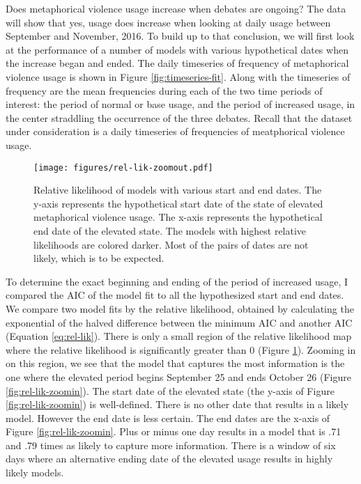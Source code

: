 Does metaphorical violence usage increase when debates are ongoing? The data
will show that yes, usage does increase when looking at daily usage between September and November,
2016. To build up to that conclusion, we will first look at the performance
of a number of models with various hypothetical dates when the increase
began and ended. The daily timeseries of frequency of metaphorical violence
usage is shown in Figure \ref{fig:timeseries-fit}. Along with the timeseries
of frequency are the mean frequencies during each of the two time periods of
interest: the period of normal or base usage, and the period of increased usage,
in the center straddling the occurrence of the three debates. Recall that the
dataset under consideration is a daily timeseries of frequencies of meatphorical 
violence usage.  

\begin{figure}[h!]
  \centering
  \texttt{[image: figures/rel-lik-zoomout.pdf]}
  \caption{Relative likelihood of models with various start
  and end dates. The y-axis represents the hypothetical start date of the state of
  elevated metaphorical violence usage. The x-axis represents the hypothetical
  end date of the elevated state. 
  The models with highest relative likelihoods are colored darker. Most of the
  pairs of dates are not likely, which is to be expected.}
  \label{fig:rel-lik-zoomout}
\end{figure}

To determine
the exact beginning and ending of the period of increased usage, I compared
the AIC of the model fit to all the hypothesized start and end dates. We compare
two model fits by the relative likelihood, obtained by calculating
the exponential of the halved difference between the minimum AIC and another
AIC (Equation \ref{eq:rel-lik}).
There is only a small region of the relative likelihood map where the relative
likelihood is significantly greater than 0 (Figure \ref{fig:rel-lik-zoomout}).
Zooming in on this region, we see that the model that captures the most information
is the one where the elevated period begins September 25 and ends October 26
(Figure \ref{fig:rel-lik-zoomin}).
The start date of the elevated state (the y-axis of Figure \ref{fig:rel-lik-zoomin})
is well-defined. There is no other date that results in a likely model. 
However the end date is less certain. 
The end dates are the x-axis of Figure \ref{fig:rel-lik-zoomin}.
Plus or minus one day results in a model that is .71 and .79 times as likely
to capture more information. There is a window of six days where an alternative
ending date of the elevated usage results in highly likely models. 

